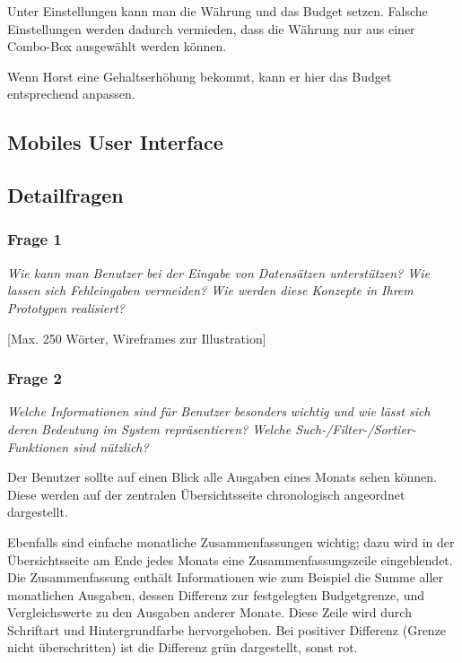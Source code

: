 Unter Einstellungen kann man die W\"ahrung und das Budget setzen. Falsche
Einstellungen werden dadurch vermieden, dass die W\"ahrung nur aus einer
Combo-Box ausgew\"ahlt werden k\"onnen.

Wenn Horst eine Gehaltserh\"ohung bekommt, kann er hier das Budget entsprechend
anpassen.

\subsection{Mobiles User Interface}
\subsection{Detailfragen}

\subsubsection{Frage 1}

\emph{Wie kann man Benutzer bei der Eingabe von Datensätzen unterstützen? Wie lassen sich Fehleingaben vermeiden? Wie werden diese Konzepte in Ihrem Prototypen realisiert?}

\vspace{2mm}


[Max. 250 Wörter, Wireframes zur Illustration]



\subsubsection{Frage 2}

\emph{Welche Informationen sind für Benutzer besonders wichtig und wie lässt sich deren Bedeutung im System repräsentieren? Welche Such-/Filter-/Sortier-Funktionen sind nützlich?}

\vspace{2mm}

Der Benutzer sollte auf einen Blick alle Ausgaben eines Monats sehen k\"onnen. Diese
werden auf der zentralen \"Ubersichtsseite chronologisch angeordnet dargestellt.

Ebenfalls sind einfache monatliche Zusammenfassungen wichtig; dazu wird in der
\"Ubersichtsseite am Ende jedes Monats eine Zusammenfassungszeile eingeblendet.
Die Zusammenfassung enth\"alt Informationen wie zum Beispiel die Summe aller monatlichen
Ausgaben, dessen Differenz zur festgelegten Budgetgrenze, und Vergleichswerte zu den Ausgaben
anderer Monate. Diese Zeile wird durch Schriftart und Hintergrundfarbe hervorgehoben.
Bei positiver Differenz (Grenze nicht \"uberschritten) ist die Differenz gr\"un dargestellt,
sonst rot.

